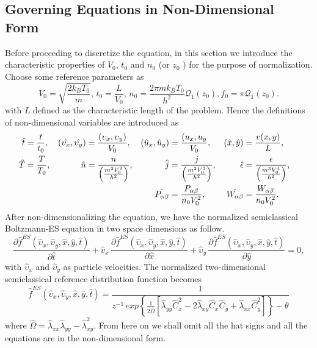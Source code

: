 \documentclass{rsproca}%
\begin{document}
\subsection{Governing Equations in Non-Dimensional Form}
\label{subsec:3_1}
Before proceeding to discretize the equation, in this section we introduce the characteristic properties of $V_0$, $t_0$ and $n_0$ (or $z_0$ ) for the purpose of normalization.  Choose some reference parameters as
\begin{equation}
V_0 = \sqrt{\frac{2k_B T_0}{m}}, \, t_0 = \frac{L}{V_0},\, n_{0} = \frac{2 \pi m k_B T_0}{h^2} \mathcal{Q}_1 (z_0), f_0=\pi \mathcal{Q}_1(z_0).
\end{equation}
with $L$ defined as the characteristic length of the problem. Hence the definitions of non-dimensional variables are introduced as
\begin{align}
\hat{t} &=\frac{t}{t_0},& (\hat{\upsilon_x}, \hat{\upsilon_y})&={(\upsilon_x,\upsilon_y)\over V_0},&
(\hat{u}_x,\hat{u}_y)&=\frac{(u_x,u_y}{V_0},& (\hat{x},\hat{y})&=\frac{v(x, y)}{L},& \nonumber \\
\hat{T}&=\frac{T}{T_0},& \hat{n}&={n \over \left(\frac{m^2V_0^2}{h^2}\right)},&
\hat{j}&={j \over \left(\frac{m^2V_{0}^3}{h^2}\right) },& \hat{\epsilon}&={\epsilon \over \left(\frac{m^3 V_{0}^4}{h^2}\right)},& \nonumber \\
& & & &\hat{P_{\alpha \beta}} &= { P_{\alpha \beta} \over n_{0} V_{0}^2 },& \hat{W_{\alpha \beta}} &= { W_{\alpha \beta} \over n_{0} V_0^2}.&
\end{align}
After non-dimensionalizing the equation, we have the normalized semiclassical Boltzmann-ES equation in two space dimensions as follow.
\begin{equation}
\frac{\partial\hat{f}^{ES}(\hat{\upsilon}_x,\hat{\upsilon}_y,\hat{x},\hat{y},\hat{t})}{\partial\hat{t}} + \hat{\upsilon}_x\,\frac{\partial\hat{f}^{ES}(\hat{\upsilon}_x,\hat{\upsilon}_y,\hat{x},\hat{y},\hat{t})}{\partial\hat{x}} + \hat{\upsilon}_y\,\frac{\partial\hat{f}^{ES}(\hat{\upsilon}_x,\hat{\upsilon}_y,\hat{x},\hat{y},\hat{t})}{\partial\hat{y}} = 0, \label{normalizedes}
\end{equation}
with $\hat{\upsilon}_x$ and $\hat{\upsilon}_y$ as particle velocities. The normalized two-dimensional semiclassical reference distribution function becomes
\begin{equation}
\hat{f}^{ES}\left(\hat{\upsilon}_x,\hat{\upsilon}_y,\hat{x},\hat{y},\hat{t}\right) =
\frac{1}{z^{-1}\,exp\left\{ \frac{1}{2 \hat{\Omega}} \left[ \hat{\lambda}_{yy} \hat{C}_x^2 - 2
\hat{\lambda}_{xy} \hat{C}_x \hat{C}_y + \hat{\lambda}_{xx} \hat{C}_y^2 \right]  \right\} - \theta }
\end{equation}
where $\hat{\Omega} = \hat{\lambda}_{xx} \hat{ \lambda}_{yy} - \hat{\lambda}_{xy}^2$.
From here on we shall omit all the hat signs and all the equations are in the non-dimensional form.
\end{document}
